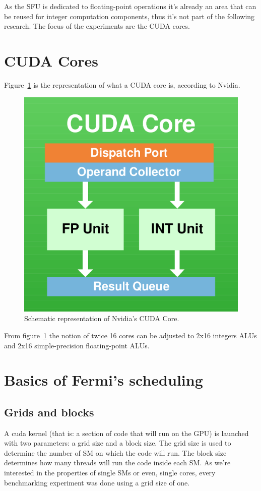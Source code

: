 \documentclass{report}
\begin{document}
    As the SFU is dedicated to floating-point operations it's already an area
    that can be reused for integer computation components, thus it's not part
    of the following research. The focus of the experiments are the CUDA cores.

    \section{CUDA Cores}
    Figure~\ref{fig:CUDACore} is the representation of what a CUDA core is,
    according to Nvidia.
    
    \begin{figure}[H]
    \centering
        \includegraphics[width=0.5\linewidth]{pictures/CUDACore}
        \captionsetup{justification=centering}
        \caption{Schematic representation of Nvidia's CUDA Core.}
        \label{fig:CUDACore}
    \end{figure}
    
    From figure~\ref{fig:CUDACore} the notion of twice 16 cores can be
    adjusted to 2x16 integers ALUs and 2x16 simple-precision floating-point
    ALUs.

    \section{Basics of Fermi's scheduling}
        \subsection{Grids and blocks} 
        A cuda kernel (that is: a section of code that will run on the GPU) is
        launched with two parameters: a grid size and a block size. The grid 
        size is used to determine the number of SM on which the code will run.
        The block size determines how many threads will run the code inside each
        SM. As we're interested in the properties of single SMs or even, single
        cores, every benchmarking experiment was done using a grid size of one.
\end{document}
